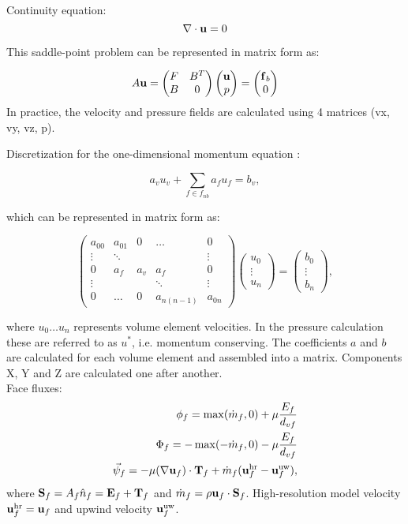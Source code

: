 \documentclass[12pt]{article}
\newcommand{\vb}[1]{\text{\textbf{#1}}}
\begin{document}
Continuity equation:
$$
\nabla \cdot \vb u = 0
$$

This saddle-point problem can be represented in matrix form as:

$$
A \vb u = \begin{pmatrix}
  F & B^T \\
  B & 0
\end{pmatrix}
\begin{pmatrix}
  \vb u \\
  p
\end{pmatrix} =
\begin{pmatrix}
  \vb f_b \\
  0
\end{pmatrix}
$$
  In practice, the velocity and pressure fields are calculated using 4 matrices (vx, vy, vz, p).

Discretization for the one-dimensional momentum equation \cite{mou}:

\begin{equation}
  a_v u_v + \sum_{f \in f_{nb}} a_f u_f = b_v,
\end{equation}

which can be represented in matrix form as:

$$
\begin{pmatrix}
  a_{00} & a_{01} & 0 & \dots & 0 \\
  \vdots & \ddots & &  & \vdots \\
  0 & a_f & a_v & a_f & 0 \\
  \vdots & &  & \ddots & \vdots \\
  0 & \dots & 0 & a_{n (n - 1)} & a_{0n}
\end{pmatrix}
\begin{pmatrix}
  u_0 \\
  \vdots \\
  u_n
\end{pmatrix} =
\begin{pmatrix}
  b_{0} \\
  \vdots \\
  b_n
  \end{pmatrix},
  $$

  where $u_0 \dots u_n$ represents volume element velocities. In the pressure calculation these are referred to as $u^*$, i.e. momentum conserving. The coefficients $a$ and $b$ are calculated for each volume element and assembled into a matrix. Components X, Y and Z are calculated one after another.\\

  Face fluxes:
  \begin{align}
    \phi_f = \max(\dot m_f, 0) + \mu \frac{E_f}{d_{vf}} \\
    \Phi_f = -\max(-\dot m_f, 0) - \mu \frac{E_f}{d_{vf}} \\
    \vec \psi_f = - \mu (\nabla \vb u_f) \cdot \vb T_f + \dot m_f (\vb u_f^{\text{hr}} - \vb u_f^{\text{uw}}),
  \end{align}
  where $\vb S_f = A_f \hat n_f = \vb E_f + \vb T_f$ and $\dot m_f = \rho \vb u_f \cdot \vb S_f$. High-resolution model velocity $\vb u_f^{\text{hr}} = \vb u_f$ and upwind velocity $\vb u_f^{\text{uw}}$.\\
\end{document}
